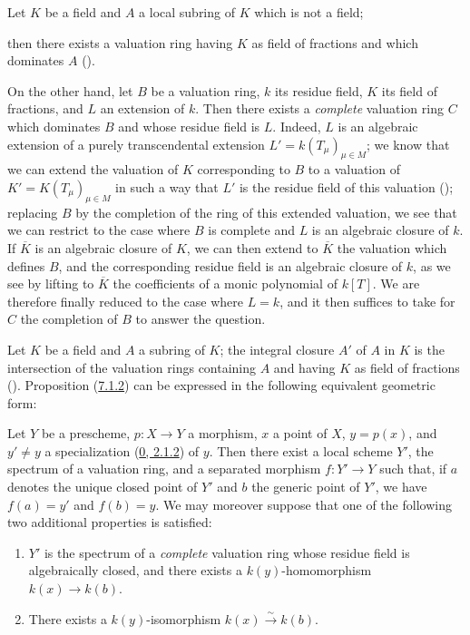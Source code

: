 \begin{env}[7.1.2]
\label{II.7.1.2}
Let $K$ be a field and $A$ a local subring of $K$ which is not a field;


then there exists a valuation ring having $K$ as field of fractions and
which dominates $A$ (\cite[p.~1-07, lemma~2]{I-1}).

On the other hand, let $B$ be a valuation ring, $k$ its residue field,
$K$ its field of fractions, and $L$ an extension of $k$. Then there exists a
\emph{complete} valuation ring $C$ which dominates $B$ and whose residue
field is $L$. Indeed, $L$ is an algebraic extension of a purely transcendental
extension $L'=k(T_\mu)_{\mu\in M}$; we know that we can extend the
valuation of $K$ corresponding to $B$ to a valuation of
$K'=K(T_\mu)_{\mu\in M}$ in such a way that $L'$ is the residue field of this
valuation (\cite[p.~98]{II-24}); replacing $B$ by the completion of the ring
of this extended valuation, we see that we can restrict to the case where $B$
is complete and $L$ is an algebraic closure of $k$. If $\overline{K}$ is an
algebraic closure of $K$, we can then extend to $\overline{K}$ the
valuation which defines $B$, and the corresponding residue field is an
algebraic closure of $k$, as we see by lifting to $\overline{K}$
the coefficients of a monic polynomial of $k[T]$. We are therefore finally
reduced to the case where $L=k$, and it then suffices to take for $C$ the
completion of $B$ to answer the question.
\end{env}

\begin{env}[7.1.3]
\label{II.7.1.3}
Let $K$ be a field and $A$ a subring of $K$; the integral closure $A'$
of $A$ in $K$ is the intersection of the valuation rings containing $A$ and
having $K$ as field of fractions
(\cite[p.~51, th.~2]{I-11}). Proposition
(\hyperref[II.7.1.2]{7.1.2}) can be expressed in the following equivalent
geometric form:
\end{env}

\begin{proposition}[7.1.4]
\label{II.7.1.4}
Let $Y$ be a prescheme, $p:X\to Y$ a morphism, $x$ a point of $X$,
$y=p(x)$, and $y'\neq y$ a specialization
(\hyperref[0.2.1.2]{0, 2.1.2}) of $y$. Then there exist a local scheme
$Y'$, the spectrum of a valuation ring, and a separated morphism $f:Y'\to Y$
such that, if $a$ denotes the unique closed point of $Y'$ and $b$ the generic
point of $Y'$, we have $f(a)=y'$ and $f(b)=y$. We may moreover suppose
that one of the following two additional properties is satisfied:
\begin{enumerate}
\item[\rm{(i)}] $Y'$ is the spectrum of a \emph{complete} valuation ring
whose residue field is algebraically closed, and there exists a
$k(y)$-homomorphism $k(x)\to k(b)$.
\item[\rm{(ii)}] There exists a $k(y)$-isomorphism
$k(x)\xrightarrow{\sim}k(b)$.
\end{enumerate}
\end{proposition}

